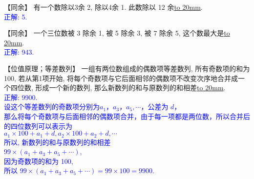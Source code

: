 \item {
    【同余】
    有一个数除以3余 2, 除以4余 1. 此数除以 12 余\underline{\hbox to 20mm{}}.
    \ifshowSolution
        \\\fangsong{}\textcolor{blue}{
            正解: 5.
        }
    \else
        \vspace{1cm}
    \fi
}

\item {
    【同余】
    一个三位数被 3 除余 1, 被 5 除余 3, 被 7 除余 5, 这个数最大是\underline{\hbox to 20mm{}}.
    \ifshowSolution
        \\\fangsong{}\textcolor{blue}{
            正解: 943.
        }
    \else
        \vspace{1cm}
    \fi
}

\item {
    【位值原理；等差数列】
    一组有两位数组成的偶数项等差数列, 所有奇数项的和为100, 若从第1项开始, 将每个奇数项与它后面相邻的偶数项不改变次序地合并成一个四位数, 形成一个新的数列, 那么新数列的和与原数列的和相差\underline{\hbox to 20mm{}}.
    \ifshowSolution
        \\\fangsong{}\textcolor{blue}{
            正解: 9900.\\
            设这个等差数列的奇数项分别为$a_1，a_3，a_5,\cdots$，公差为 $d$，\\
            那么将每个奇数项与后面相邻的偶数项合并，由于每一项都是两位数，所以合并后的四位数列可以表示为\\
            $a_1\times 100 + a_1+d, a_2\times 100 + a_2 + d,\cdots$\\
            所以, 新数列的和与原数列的和相差\\
            $99\times (a_1+a_3+a_5+\cdots)$,\\
            因为奇数项的和为 100, \\
            所以 $99\times (a_1+a_3+a_5+\cdots) = 99\times 100 = 9900$.
        }
    \else
        \vspace{1cm}
    \fi
}
